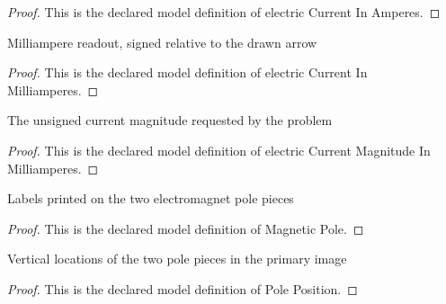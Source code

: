 \begin{proof}
  This is the declared model definition of electric Current In Amperes.
\end{proof}
\begin{definition}
  \label{def:physics:phyx-mini-0935:phyxminiproblems-problemphyxmini0935-electriccurrentinmilliamperes}
  Milliampere readout, signed relative to the drawn arrow
\end{definition}
\begin{proof}
  This is the declared model definition of electric Current In Milliamperes.
\end{proof}
\begin{definition}
  \label{def:physics:phyx-mini-0935:phyxminiproblems-problemphyxmini0935-electriccurrentmagnitudeinmilliamperes}
  The unsigned current magnitude requested by the problem
\end{definition}
\begin{proof}
  This is the declared model definition of electric Current Magnitude In Milliamperes.
\end{proof}
\begin{definition}
  \label{def:physics:phyx-mini-0935:phyxminiproblems-problemphyxmini0935-magneticpole}
  Labels printed on the two electromagnet pole pieces
\end{definition}
\begin{proof}
  This is the declared model definition of Magnetic Pole.
\end{proof}
\begin{definition}
  \label{def:physics:phyx-mini-0935:phyxminiproblems-problemphyxmini0935-poleposition}
  Vertical locations of the two pole pieces in the primary image
\end{definition}
\begin{proof}
  This is the declared model definition of Pole Position.
\end{proof}
